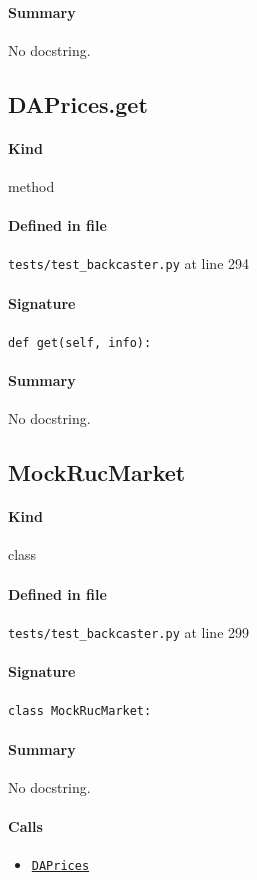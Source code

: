 \documentclass[11pt]{report}
\begin{document}
\paragraph{Summary} No docstring.
\subsection{DAPrices.get}
\label{def:tests-test_backcaster.py:DAPrices.get:L294}
\paragraph{Kind} method
\paragraph{Defined in file} \texttt{tests/test\_backcaster.py} at line 294
\paragraph{Signature} \texttt{def get(self, info):}
\paragraph{Summary} No docstring.
\subsection{MockRucMarket}
\label{def:tests-test_backcaster.py:MockRucMarket:L299}
\paragraph{Kind} class
\paragraph{Defined in file} \texttt{tests/test\_backcaster.py} at line 299
\paragraph{Signature} \texttt{class MockRucMarket:}
\paragraph{Summary} No docstring.
\paragraph{Calls}
\begin{itemize}[leftmargin=*]
  \item \hyperref[def:tests-test_backcaster.py:DAPrices:L290]{\texttt{DAPrices}}
\end{itemize}
\end{document}
